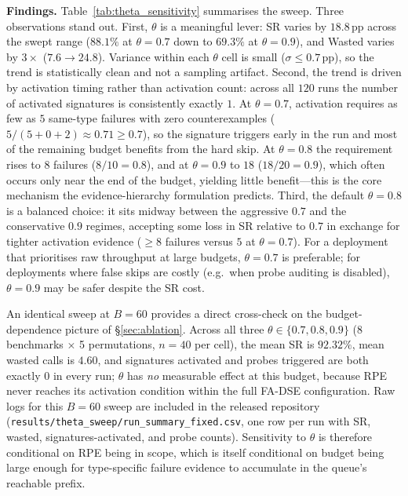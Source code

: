 \documentclass[journal]{IEEEtran}
\begin{document}
\textbf{Findings.} Table~\ref{tab:theta_sensitivity} summarises the sweep. Three observations stand out. First, $\theta$ is a meaningful lever: SR varies by $18.8$\,pp across the swept range ($88.1\%$ at $\theta{=}0.7$ down to $69.3\%$ at $\theta{=}0.9$), and Wasted varies by $3\times$ ($7.6 \to 24.8$). Variance within each $\theta$ cell is small ($\sigma \leq 0.7$\,pp), so the trend is statistically clean and not a sampling artifact. Second, the trend is driven by activation timing rather than activation count: across all $120$ runs the number of activated signatures is consistently exactly $1$. At $\theta{=}0.7$, activation requires as few as $5$ same-type failures with zero counterexamples ($5/(5{+}0{+}2) \approx 0.71 \geq 0.7$), so the signature triggers early in the run and most of the remaining budget benefits from the hard skip. At $\theta{=}0.8$ the requirement rises to $8$ failures ($8/10 = 0.8$), and at $\theta{=}0.9$ to $18$ ($18/20 = 0.9$), which often occurs only near the end of the budget, yielding little benefit---this is the core mechanism the evidence-hierarchy formulation predicts. Third, the default $\theta{=}0.8$ is a balanced choice: it sits midway between the aggressive $0.7$ and the conservative $0.9$ regimes, accepting some loss in SR relative to $0.7$ in exchange for tighter activation evidence ($\geq 8$ failures versus $5$ at $\theta{=}0.7$). For a deployment that prioritises raw throughput at large budgets, $\theta{=}0.7$ is preferable; for deployments where false skips are costly (e.g.\ when probe auditing is disabled), $\theta{=}0.9$ may be safer despite the SR cost.

An identical sweep at $B{=}60$ provides a direct cross-check on the budget-dependence picture of \S\ref{sec:ablation}. Across all three $\theta \in \{0.7, 0.8, 0.9\}$ (8 benchmarks $\times$ 5 permutations, $n{=}40$ per cell), the mean SR is $92.32\%$, mean wasted calls is $4.60$, and signatures activated and probes triggered are both exactly $0$ in every run; $\theta$ has \emph{no} measurable effect at this budget, because RPE never reaches its activation condition within the full FA-DSE configuration. Raw logs for this $B{=}60$ sweep are included in the released repository (\texttt{results/theta\_sweep/run\_summary\_fixed.csv}, one row per run with SR, wasted, signatures-activated, and probe counts). Sensitivity to $\theta$ is therefore conditional on RPE being in scope, which is itself conditional on budget being large enough for type-specific failure evidence to accumulate in the queue's reachable prefix.
\end{document}
